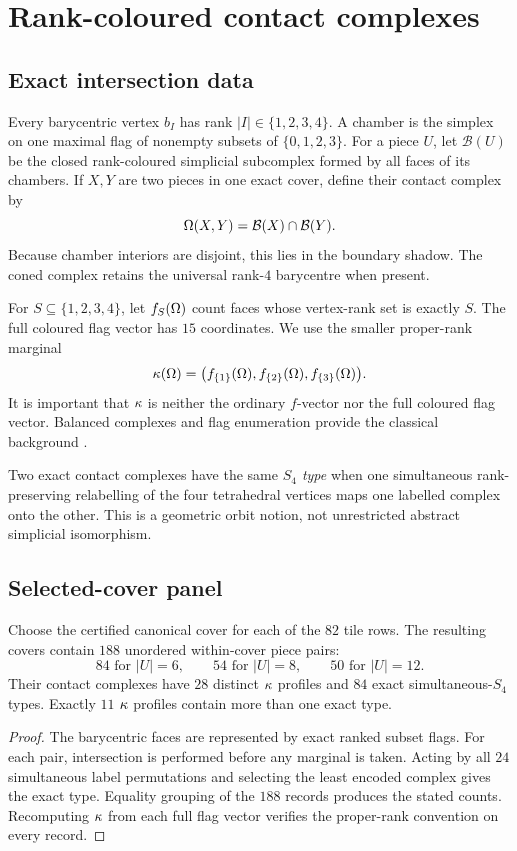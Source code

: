 \section{Rank-coloured contact complexes}\label{sec:contacts}

\subsection{Exact intersection data}

Every barycentric vertex $b_I$ has rank $|I|\in\{1,2,3,4\}$.  A chamber is
the simplex on one maximal flag of nonempty subsets of $\{0,1,2,3\}$.  For a
piece $U$, let $\mathcal B(U)$ be the closed rank-coloured simplicial
subcomplex formed by all faces of its chambers.  If $X,Y$ are two pieces in
one exact cover, define their contact complex by
\[
 \Omega(X,Y)=\mathcal B(X)\cap\mathcal B(Y).
\]
Because chamber interiors are disjoint, this lies in the boundary shadow.
The coned complex retains the universal rank-$4$ barycentre when present.

For $S\subseteq\{1,2,3,4\}$, let $f_S(\Omega)$ count faces whose vertex-rank set
is exactly $S$.  The full coloured flag vector has $15$ coordinates.  We use
the smaller proper-rank marginal
\[
 \kappa(\Omega)=\bigl(f_{\{1\}}(\Omega),f_{\{2\}}(\Omega),f_{\{3\}}(\Omega)\bigr).
\]
It is important that $\kappa$ is neither the ordinary $f$-vector nor the full
coloured flag vector.  Balanced complexes and flag enumeration provide the
classical background \cite{Stanley1979,Frohmader2012,White2022}.

Two exact contact complexes have the same \emph{$S_4$ type} when one
simultaneous rank-preserving relabelling of the four tetrahedral vertices
maps one labelled complex onto the other.  This is a geometric orbit notion,
not unrestricted abstract simplicial isomorphism.

\subsection{Selected-cover panel}

\begin{theorem}\label{thm:selected-contacts}
Choose the certified canonical cover for each of the $82$ tile rows.  The
resulting covers contain $188$ unordered within-cover piece pairs:
\[
84\text{ for }|U|=6,\qquad54\text{ for }|U|=8,\qquad
50\text{ for }|U|=12.
\]
Their contact complexes have $28$ distinct $\kappa$ profiles and $84$ exact
simultaneous-$S_4$ types.  Exactly $11$ $\kappa$ profiles contain more than one
exact type.
\end{theorem}
\begin{proof}
The barycentric faces are represented by exact ranked subset flags.  For each
pair, intersection is performed before any marginal is taken.  Acting by all
$24$ simultaneous label permutations and selecting the least encoded complex
gives the exact type.  Equality grouping of the $188$ records produces the
stated counts.  Recomputing $\kappa$ from each full flag vector verifies the
proper-rank convention on every record.
\end{proof}

